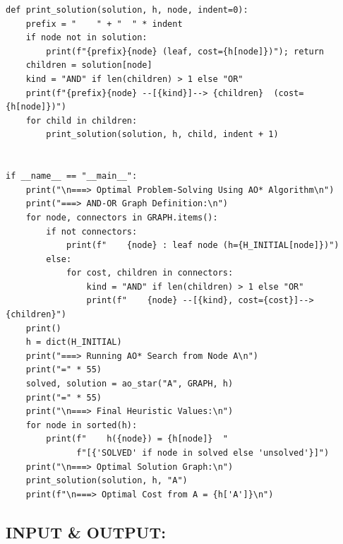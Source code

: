 \documentclass[12pt,a4paper]{article}
\begin{document}
\begin{lstlisting}
def print_solution(solution, h, node, indent=0):
    prefix = "    " + "  " * indent
    if node not in solution:
        print(f"{prefix}{node} (leaf, cost={h[node]})"); return
    children = solution[node]
    kind = "AND" if len(children) > 1 else "OR"
    print(f"{prefix}{node} --[{kind}]--> {children}  (cost={h[node]})")
    for child in children:
        print_solution(solution, h, child, indent + 1)


if __name__ == "__main__":
    print("\n===> Optimal Problem-Solving Using AO* Algorithm\n")
    print("===> AND-OR Graph Definition:\n")
    for node, connectors in GRAPH.items():
        if not connectors:
            print(f"    {node} : leaf node (h={H_INITIAL[node]})")
        else:
            for cost, children in connectors:
                kind = "AND" if len(children) > 1 else "OR"
                print(f"    {node} --[{kind}, cost={cost}]--> {children}")
    print()
    h = dict(H_INITIAL)
    print("===> Running AO* Search from Node A\n")
    print("=" * 55)
    solved, solution = ao_star("A", GRAPH, h)
    print("=" * 55)
    print("\n===> Final Heuristic Values:\n")
    for node in sorted(h):
        print(f"    h({node}) = {h[node]}  "
              f"[{'SOLVED' if node in solved else 'unsolved'}]")
    print("\n===> Optimal Solution Graph:\n")
    print_solution(solution, h, "A")
    print(f"\n===> Optimal Cost from A = {h['A']}\n")
\end{lstlisting}

\subsection{INPUT \& OUTPUT:}
\end{document}
